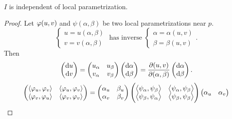 \begin{theorem}
    \(I\) is independent of local parametrization.
\end{theorem}
\begin{proof}
    Let \(\varphi(u,v)\) and \(\psi(\alpha,\beta)\) be two local parametrizations
    near \(p\). \[
        \begin{cases}
            u=u(\alpha,\beta) \\
            v=v(\alpha,\beta)
        \end{cases}
        \text{ has inverse }
        \begin{cases}
            \alpha=\alpha(u,v) \\
            \beta=\beta(u,v)
        \end{cases}
    .\] Then \[
        \begin{pmatrix}
            \dd{u} \\ \dd{v}
        \end{pmatrix}=\begin{pmatrix}
        u_{\alpha} & u_\beta \\
        v_\alpha & v_\beta
        \end{pmatrix}\begin{pmatrix}
            \dd{\alpha} \\ \dd{\beta}
        \end{pmatrix}=\pdv{(u,v)}{(\alpha,\beta)}\begin{pmatrix}
            \dd{\alpha} \\ \dd{\beta}
        \end{pmatrix}
    .\] \[
        \begin{pmatrix}
            \left<\varphi_u,\varphi_v\right> & \left<\varphi_u,\varphi_v\right> \\
            \left<\varphi_v,\varphi_u\right> & \left<\varphi_v,\varphi_v\right> 
        \end{pmatrix}=\begin{pmatrix}
            \alpha_u & \beta_u \\
            \alpha_v & \beta_v
        \end{pmatrix}\begin{pmatrix}
        \left<\psi_\alpha,\psi_\beta\right> & \left<\psi_\alpha,\psi_\beta\right> \\
        \left<\psi_\beta,\psi_\alpha\right> & \left<\psi_\beta,\psi_\beta\right> 
        \end{pmatrix}\begin{pmatrix}
            \alpha_u & \alpha_v \\

\end{pmatrix}\]
\end{proof}
